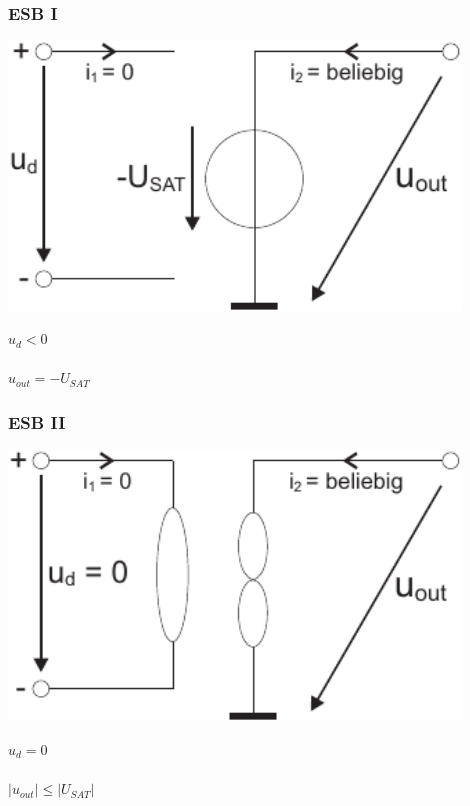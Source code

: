 \documentclass[a4paper,twocolumn,10pt]{article}
\begin{document}
\subsubsection*{ESB I}
\begin{minipage}[b]{0.3\textwidth}
\includegraphics[width=0.9\textwidth]{Grafiken/OP_ESBI}
\end{minipage}
\hfill
\begin{minipage}[b]{0.16\textwidth}
$u_d<0$\\\\
$u_{out}=-U_{SAT}$
\end{minipage}

\subsubsection*{ESB II}
\begin{minipage}[b]{0.3\textwidth}
\includegraphics[width=0.9\textwidth]{Grafiken/OP_ESBII}
\end{minipage}
\hfill
\begin{minipage}[b]{0.16\textwidth}
$u_d=0$\\\\
$|u_{out}|\leq |U_{SAT}|$
\end{minipage}
\end{document}
